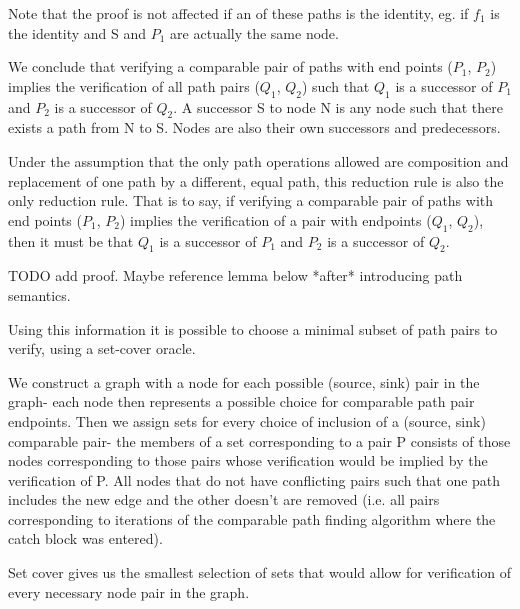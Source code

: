 \documentclass{article}
\begin{document}
Note that the proof is not affected if an of these paths is the identity, eg. if $f_1$ is the identity and S and $P_1$ are actually the same node.

We conclude that verifying a comparable pair of paths with end points ($P_1$, $P_2$) implies the verification of all path pairs ($Q_1$, $Q_2$) such that $Q_1$ is a successor of $P_1$ and $P_2$ is a successor of $Q_2$. A successor S to node N is any node such that there exists a path from N to S. Nodes are also their own successors and predecessors.

Under the assumption that the only path operations allowed are composition and replacement of one path by a different, equal path, this reduction rule is also the only reduction rule.
That is to say, if verifying a comparable pair of paths with end points ($P_1$, $P_2$) implies the verification of a pair with endpoints ($Q_1$, $Q_2$), then it must be that $Q_1$ is a successor of $P_1$ and $P_2$ is a successor of $Q_2$.

TODO add proof. Maybe reference lemma below *after* introducing path semantics.

Using this information it is possible to choose a minimal subset of path pairs to verify, using a set-cover oracle.

We construct a graph with a node for each possible (source, sink) pair in the graph- each node then represents a possible choice for comparable path pair endpoints. Then we assign sets for every choice of inclusion of a (source, sink) comparable pair- the members of a set corresponding to a pair P consists of those nodes corresponding to those pairs whose verification would be implied by the verification of P.
All nodes that do not have conflicting pairs such that one path includes the new edge and the other doesn't are removed (i.e. all pairs corresponding to iterations of the comparable path finding algorithm where the catch block was entered).

Set cover gives us the smallest selection of sets that would allow for verification of every necessary node pair in the graph.
\end{document}
